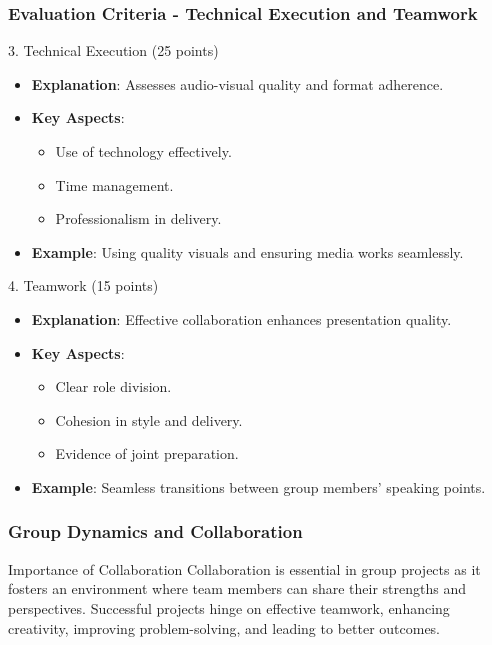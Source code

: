 \documentclass[aspectratio=169]{beamer}
\begin{document}
\begin{frame}[fragile]
    \frametitle{Evaluation Criteria - Technical Execution and Teamwork}
    \begin{block}{3. Technical Execution (25 points)}
        \begin{itemize}
            \item \textbf{Explanation}: Assesses audio-visual quality and format adherence.
            \item \textbf{Key Aspects}:
            \begin{itemize}
                \item Use of technology effectively.
                \item Time management.
                \item Professionalism in delivery.
            \end{itemize}
            \item \textbf{Example}: Using quality visuals and ensuring media works seamlessly.
        \end{itemize}
    \end{block}
    
    \begin{block}{4. Teamwork (15 points)}
        \begin{itemize}
            \item \textbf{Explanation}: Effective collaboration enhances presentation quality.
            \item \textbf{Key Aspects}:
            \begin{itemize}
                \item Clear role division.
                \item Cohesion in style and delivery.
                \item Evidence of joint preparation.
            \end{itemize}
            \item \textbf{Example}: Seamless transitions between group members' speaking points.
        \end{itemize}
    \end{block}
\end{frame}

\begin{frame}[fragile]
    \frametitle{Group Dynamics and Collaboration}
    \begin{block}{Importance of Collaboration}
        Collaboration is essential in group projects as it fosters an environment where team members can share their strengths and perspectives. Successful projects hinge on effective teamwork, enhancing creativity, improving problem-solving, and leading to better outcomes.
    \end{block}
\end{frame}
\end{document}
